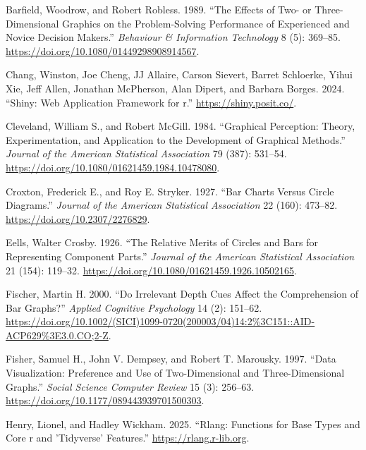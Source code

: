 \documentclass[
  letterpaper,
  DIV=11,
  numbers=noendperiod]{scrartcl}
\newlength{\cslhangindent}
\newenvironment{CSLReferences}[2] %
 {\begin{list}{}{%
  \setlength{\itemindent}{0pt}
  \setlength{\leftmargin}{0pt}
  \setlength{\parsep}{0pt}
  \ifodd #1
   \setlength{\leftmargin}{\cslhangindent}
   \setlength{\itemindent}{-1\cslhangindent}
  \fi
  \setlength{\itemsep}{#2\baselineskip}}}
 {\end{list}}
\begin{document}
\label{refs}
\begin{CSLReferences}{1}{0}
Barfield, Woodrow, and Robert Robless. 1989. {``The Effects of Two- or
Three-Dimensional Graphics on the Problem-Solving Performance of
Experienced and Novice Decision Makers.''} \emph{Behaviour \&
Information Technology} 8 (5): 369--85.
\url{https://doi.org/10.1080/01449298908914567}.

Chang, Winston, Joe Cheng, JJ Allaire, Carson Sievert, Barret Schloerke,
Yihui Xie, Jeff Allen, Jonathan McPherson, Alan Dipert, and Barbara
Borges. 2024. {``Shiny: Web Application Framework for r.''}
\url{https://shiny.posit.co/}.

Cleveland, William S., and Robert McGill. 1984. {``Graphical Perception:
Theory, Experimentation, and Application to the Development of Graphical
Methods.''} \emph{Journal of the American Statistical Association} 79
(387): 531--54. \url{https://doi.org/10.1080/01621459.1984.10478080}.

Croxton, Frederick E., and Roy E. Stryker. 1927. {``Bar Charts Versus
Circle Diagrams.''} \emph{Journal of the American Statistical
Association} 22 (160): 473--82. \url{https://doi.org/10.2307/2276829}.

Eells, Walter Crosby. 1926. {``The Relative Merits of Circles and Bars
for Representing Component Parts.''} \emph{Journal of the American
Statistical Association} 21 (154): 119--32.
\url{https://doi.org/10.1080/01621459.1926.10502165}.

Fischer, Martin H. 2000. {``Do Irrelevant Depth Cues Affect the
Comprehension of Bar Graphs?''} \emph{Applied Cognitive Psychology} 14
(2): 151--62.
\url{https://doi.org/10.1002/(SICI)1099-0720(200003/04)14:2\%3C151::AID-ACP629\%3E3.0.CO;2-Z}.

Fisher, Samuel H., John V. Dempsey, and Robert T. Marousky. 1997.
{``Data Visualization: Preference and Use of Two-Dimensional and
Three-Dimensional Graphs.''} \emph{Social Science Computer Review} 15
(3): 256--63. \url{https://doi.org/10.1177/089443939701500303}.

Henry, Lionel, and Hadley Wickham. 2025. {``Rlang: Functions for Base
Types and Core r and 'Tidyverse' Features.''}
\url{https://rlang.r-lib.org}.


\end{CSLReferences}
\end{document}
